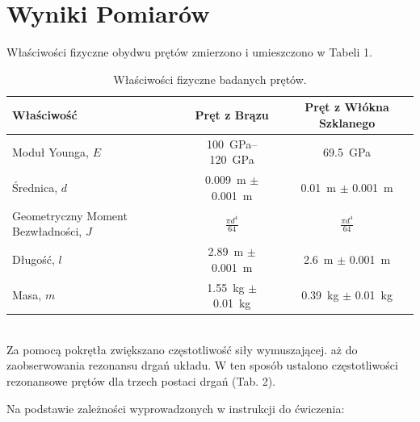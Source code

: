 \documentclass[12pt]{article}
\begin{document}
\section*{Wyniki Pomiarów}
Właściwości fizyczne obydwu prętów zmierzono i umieszczono w Tabeli 1.
\begin{table}[h!]
\centering
\begin{tabular}{lcc}
\toprule
Właściwość & Pręt z Brązu & Pręt z Włókna Szklanego\\
\midrule
Moduł Younga, $E$ & \SIrange{100}{120}{\giga\pascal} & \SI{69.5}{\giga\pascal} \\
Średnica, $d$ & \SI{0,009}{\meter} $\pm$ \SI{0,001}{\meter} & \SI{0.01}{\meter} $\pm$ \SI{0,001}{\meter} \\
Geometryczny Moment Bezwładności, $J$ & \(\frac{\pi d^4}{64}\) & \(\frac{\pi d^4}{64}\) \\
Długość, $l$ & \SI{2.89}{\meter} $\pm$ \SI{0,001}{\meter} & \SI{2.6}{\meter} $\pm$ \SI{0,001}{\meter} \\
Masa, $m$ & \SI{1.55}{\kilogram} $\pm$ \SI{0,01}{\kilogram} & \SI{0.39}{\kilogram} $\pm$ \SI{0,01}{\kilogram} \\
\bottomrule
\end{tabular}
\caption{Właściwości fizyczne badanych prętów.}
\label{table:properties}
\end{table}
\\Za pomocą pokrętła zwiększano częstotliwość siły wymuszającej. aż do zaobserwowania rezonansu drgań układu. W ten sposób ustalono częstotliwości rezonansowe prętów dla trzech postaci drgań (Tab. 2).
\begin{table}[h!]
\centering
{}
\caption{Zmierzone wartości częstotliwości rezonansowych badanych prętów.}
\label{table:frequencies}
\end{table}
\newpage
Na podstawie zależności wyprowadzonych w instrukcji do ćwiczenia:\\
\end{document}
